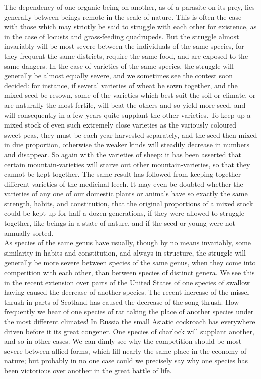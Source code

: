 \indent The dependency of one organic being on another, as of a parasite on its prey, lies generally between beings remote in the scale of nature. This is often the case with those which may strictly be said to struggle with each other for existence, as in the case of locusts and grass-feeding quadrupeds.  But the struggle almost invariably will be most severe between the individuals of the same species, for they frequent the same districts, require the same food, and are exposed to the same dangers. In the case of varieties of the same species, the struggle will generally be almost equally severe, and we sometimes see the contest soon decided: for instance, if several varieties of wheat be sown together, and the mixed seed be resown, some of the varieties which best suit the soil or climate, or are naturally the most fertile, will beat the others and so yield more seed, and will consequently in a few years quite supplant the other varieties. To keep up a mixed stock of even such extremely close varieties as the variously coloured sweet-peas, they must be each year harvested separately, and the seed then mixed in due proportion, otherwise the weaker kinds will steadily decrease in numbers and disappear. So again with the varieties of sheep: it has been asserted that certain mountain-varieties will starve out other mountain-varieties, so that they cannot be kept together.  The same result has followed from keeping together different varieties of the medicinal leech. It may even be doubted whether the varieties of any one of our domestic plants or animals have so exactly the same strength, habits, and constitution, that the original proportions of a mixed stock could be kept up for half a dozen generations, if they were allowed to struggle together, like beings in a state of nature, and if the seed or young were not annually sorted.\\
\indent As species of the same genus have usually, though by no means invariably, some similarity in habits and constitution, and always in structure, the struggle will generally be more severe between species of the same genus, when they come into competition with each other, than between species of distinct genera. We see this in the recent extension over parts of the United States of one species of swallow having caused the decrease of another species. The recent increase of the missel-thrush in parts of Scotland has caused the decrease of the song-thrush. How frequently we hear of one species of rat taking the place of another species under the most different climates! In Russia the small Asiatic cockroach has everywhere driven before it its great congener. One species of charlock will supplant another, and so in other cases. We can dimly see why the competition should be most severe between allied forms, which fill nearly the same place in the economy of nature; but probably in no one case could we precisely say why one species has been victorious over another in the great battle of life.\\
